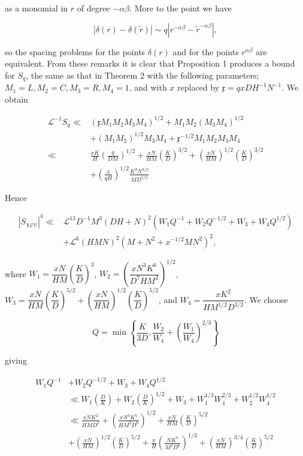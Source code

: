 \documentclass[10pt]{article}
\begin{document}
as a monomial in $r$ of degree $-\alpha \beta$. More to the point we have

$$
|\delta(r)-\delta(\tilde{r})| \sim q\left|r^{-\alpha \beta}-\tilde{r}^{-\alpha \beta}\right|,
$$

so the spacing problems for the points $\delta(r)$ and for the points $r^{\alpha \beta}$ are equivalent. From these remarks it is clear that Proposition 1 produces a bound for $S_{q}$, the same as that in Theorem 2 with the following parameters; $M_{1}=L, M_{2}=C, M_{3}=R, M_{4}=1$, and with $x$ replaced by $\mathfrak{x}=qxDH^{-1}N^{-1}$. We obtain

$$
\begin{aligned}
\mathscr{L}^{-1}S_q\ll{}&
\left(\mathfrak{x}M_1M_2M_3M_4\right)^{1/2}
+M_1M_2(M_3M_4)^{1/2}\\
&+(M_1M_2)^{1/2}M_3M_4
+\mathfrak{x}^{-1/2}M_1M_2M_3M_4\\
\ll{}&\frac{xK}{H}\left(\frac{q}{DM}\right)^{1/2}
+\frac{xN}{HM}\left(\frac{K}{D}\right)^{3/2}
+\left(\frac{xN}{HM}\right)^{1/2}\left(\frac{K}{D}\right)^{3/2}\\
&+\left(\frac{x}{qH}\right)^{1/2}\frac{K^2N^{3/2}}{MD^{5/2}}
\end{aligned}
$$

Hence

$$
\begin{aligned}
\left|S_{\chi\varphi\psi}\right|^{4}\ll{}&\mathscr{L}^{13} D^{-1} M^{3}(D H+N)^{2}\left(W_{1} Q^{-1}+W_{2} Q^{-1 / 2}+W_{3}+W_{4} Q^{1 / 2}\right) \\
& +\mathscr{L}^{6}(H M N)^{2}\left(M+N^{2}+x^{-1 / 2} M N^{2}\right)^{2},
\end{aligned}
$$

where $W_{1}=\dfrac{xN}{HM}\left(\dfrac{K}{D}\right)^{3}$, $W_{2}=\left(\dfrac{xN^{3}K^{6}}{D^{7}HM^{2}}\right)^{1/2}$, $W_{3}=\dfrac{xN}{HM}\left(\dfrac{K}{D}\right)^{5/2}+\left(\dfrac{xN}{HM}\right)^{1/2}\left(\dfrac{K}{D}\right)^{5/2}$, and $W_{4}=\dfrac{xK^{2}}{HM^{1/2}D^{3/2}}$. We choose

$$
Q=\min \left\{\frac{K}{3 D}, \frac{W_{2}}{W_{4}}+\left(\frac{W_{1}}{W_{4}}\right)^{2 / 3}\right\}
$$

giving

$$
\begin{aligned}
W_{1} Q^{-1} & +W_{2} Q^{-1 / 2}+W_{3}+W_{4} Q^{1 / 2} \\
& \ll W_{1}\left(\frac{D}{K}\right)+W_{2}\left(\frac{D}{K}\right)^{1 / 2}+W_{3}+W_{1}^{1 / 3} W_{4}^{2 / 3}+W_{2}^{1 / 2} W_{4}^{1 / 2} \\
& \ll\frac{x N K^{2}}{H M D^{2}}+\left(\frac{x N^{3} K^{5}}{H M^{2} D^{6}}\right)^{1 / 2}+\frac{x N}{H M}\left(\frac{K}{D}\right)^{5 / 2} \\
& +\left(\frac{x N}{H M}\right)^{1 / 2}\left(\frac{K}{D}\right)^{5 / 2}+\frac{x}{H}\left(\frac{N K^{7}}{M^{2} D^{6}}\right)^{1 / 3}+\left(\frac{x N}{H M}\right)^{3 / 4}\left(\frac{K}{D}\right)^{5 / 2}
\end{aligned}
$$
\end{document}
